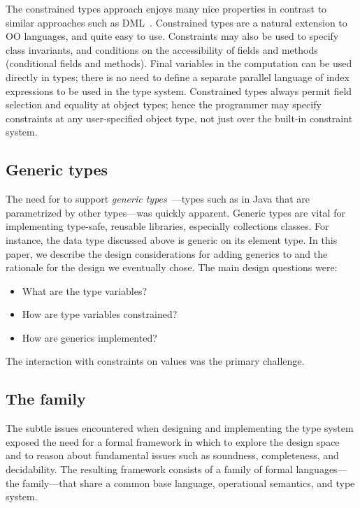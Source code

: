 The constrained types approach enjoys many nice properties in contrast
to similar approaches such as DML~\cite{xi99dependent}.  Constrained
types are a natural extension to OO languages, and quite easy to
use. Constraints may also be used to specify class invariants, and
conditions on the accessibility of fields and methods (conditional
fields and methods).  Final variables in the computation can be used
directly in types; there is no need to define a separate
parallel language of index expressions to be used in the type system.
Constrained types always
permit field selection and equality at object types; hence the
programmer may specify constraints at any user-specified object type,
not just over the built-in constraint system.  

\subsection{Generic types}

The need for \Xten to support
\emph{generic types}~\cite{clu,ada,GJ,java-popl97,thorup97,Java3,csharp-generics}---types
such as  in Java that are parametrized by other
types---was quickly apparent.  Generic types are vital for implementing type-safe, reusable libraries,
especially collections classes. For instance, the data type
 discussed above is generic on its element type.
In this paper, we describe the design considerations for adding
generics to \Xten and the rationale for the design we eventually
chose.  The main design questions were:
\begin{itemize}
        \item What are the type variables?
        \item How are type variables constrained?
        \item How are generics implemented?
\end{itemize}
The interaction with constraints on values was the primary
challenge.

\subsection{The  family}

The subtle issues
encountered when designing and implementing the \Xten type
system exposed the need for a formal framework in which to
explore the design space and to reason about fundamental issues
such as soundness, completeness, and decidability. The resulting
framework consists of a family of formal languages---the \FXG
family---that share a common base language, operational
semantics, and type system.

